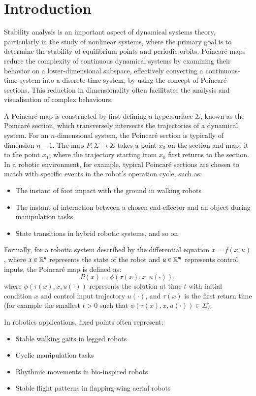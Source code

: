 \section{Introduction}
Stability analysis is an important aspect of dynamical systems theory, particularly in the study of nonlinear systems, where the primary goal is to determine the stability of equilibrium points and periodic orbits.
Poincaré maps reduce the complexity of continuous dynamical systems by examining their behavior on a lower-dimensional subspace, effectively converting a continuous-time system into a discrete-time system, by using the concept of Poincaré sections. 
This reduction in dimensionality often facilitates the analysis and visualisation of complex behaviours.

A Poincaré map is constructed by first defining a hypersurface $\Sigma$, known as the Poincaré section, which transversely intersects the trajectories of a dynamical system. 
For an $n$-dimensional system, the Poincaré section is typically of dimension $n-1$. 
The map $P: \Sigma \longrightarrow \Sigma$ takes a point $x_0$ on the section and maps it to the point $x_1$, where the trajectory starting from $x_0$ first returns to the section.
In a robotic environment, for example, typical Poincaré sections are chosen to match with specific events in the robot's operation cycle, such as:

\begin{itemize}
    \item The instant of foot impact with the ground in walking robots
    \item The instant of interaction between a chosen end-effector and an object during manipulation tasks
    \item State transitions in hybrid robotic systems, and so on.
\end{itemize}


Formally, for a robotic system described by the differential equation $\dot{x} = f(x, u)$,
where $x \in \mathbb{R}^{n}$ represents the state of the robot and $u \in \mathbb{R}^{m}$ represents control inputs, the Poincaré map is defined as:
\[
P(x) = \phi(\tau(x), x,u(\cdot)),
\]
where $\phi(\tau(x), x, u(\cdot))$ represents the solution at time $t$ with initial condition $x$ and control input trajectory $u(\cdot)$, and $\tau(x)$ is the first return time (for example the smallest $t > 0$ such that $\phi(\tau(x), x, u(\cdot)) \in \Sigma$).

In robotics applications, fixed points often represent:
\begin{itemize}
    \item Stable walking gaits in legged robots
    \item Cyclic manipulation tasks
    \item Rhythmic movements in bio-inspired robots
    \item Stable flight patterns in flapping-wing aerial robots
\end{itemize}


